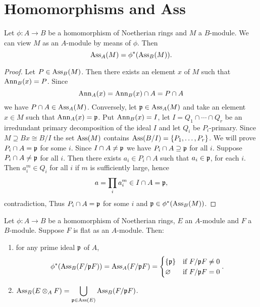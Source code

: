 \documentclass[../main]{subfiles}
\begin{document}
\section{Homomorphisms and Ass}\label{sec:09}

\begin{parproposition}\label{pro:09.01}
Let $\phi:A\longrightarrow B$ be a homomorphism of Noetherian rings and $M$ a $B$-module. We can view $M$ as an $A$-module by means of $\phi$. Then \[\operatorname{Ass}_A(M) =\phi^\ast(\operatorname{Ass}_B(M)).\]
\end{parproposition}

\begin{proof}
Let $P\in\operatorname{Ass}_B(M)$. Then there exists an element $x$ of $M$ such that $\operatorname{Ann}_B(x)=P$. Since \[\operatorname{Ann}_A(x) = \operatorname{Ann}_B(x)\cap A = P\cap A\] we have $P\cap A \in \operatorname{Ass}_A(M)$. Conversely, let $\mathfrak{p}\in \operatorname{Ass}_A(M)$ and take an element $x \in M$ such that $\operatorname{Ann}_A(x)=\mathfrak{p}$. Put $\operatorname{Ann}_B(x) = I$, let $I = Q_1\cap\cdots\cap Q_r$ be an irredundant primary decomposition of the ideal $I$ and let $Q_i$ be $P_i$-primary. Since $M\supseteq Bx \cong B/I$ the set $\operatorname{Ass}(M)$ contains $\operatorname{Ass}(B/I) = \{P_1,\dots, P_r\}$. We will prove $P_i\cap A = \mathfrak{p}$ for some $i$. Since $I\cap A\neq\mathfrak{p}$ we have $P_i\cap A\supseteq\mathfrak{p}$ for all $i$. Suppose $P_i\cap A\neq\mathfrak{p}$ for all $i$. Then there exists $a_i \in P_i\cap A$ such that $a_i\in\mathfrak{p}$, for each $i$. Then $a_i^m \in Q_i$ for all $i$ if $m$ is sufficiently large, hence \[a = \prod_ia_i^m\in I\cap A=\mathfrak{p},\] contradiction, Thus $P_i\cap A = \mathfrak{p}$ for some $i$ and $\mathfrak{p}\in\phi^\ast(\operatorname{Ass}_B(M))$.
\end{proof}

\begin{partheorem}[Bourbaki]\label{thm:012}
Let $\phi:A\longrightarrow B$ be a homomorphism of Noetherian rings, $E$ an $A$-module and $F$ a $B$-module. Suppose $F$ is flat as an $A$-module. Then:
\begin{enumerate}
    \item for any prime ideal $\mathfrak{p}$ of $A$, \[\phi^\ast(\operatorname{Ass}_B(F/\mathfrak{p}F))=\operatorname{Ass}_A(F/\mathfrak{p}F)=\begin{cases}\{\mathfrak{p}\}&\text{if }F/\mathfrak{p}F\neq0\\\varnothing&\text{if }F/\mathfrak{p}F=0\end{cases}.\]
    \item $\operatorname{Ass}_B(E \otimes_A F) = \displaystyle \bigcup_{\mathfrak{p}\in\operatorname{Ass}(E)}\operatorname{Ass}_B(F/\mathfrak{p}F)$.
\end{enumerate}
\end{partheorem}
\end{document}
